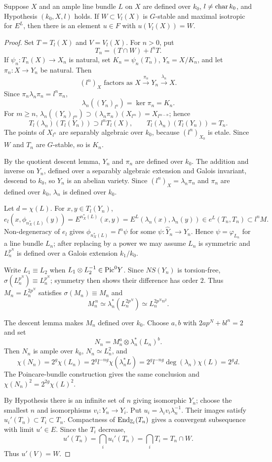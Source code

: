 \begin{proposition}[Step V]
\label{mumford-appI-step-V}
Suppose $X$ and an ample line bundle $L$ on $X$ are defined over $k_0$,
$l\ne {\rm char}\,k_0$, and Hypothesis $(k_0,X,l)$ holds. If
$W\subset V_l(X)$ is $G$-stable and maximal isotropic for $E^L$, then there
is an element $u\in F$ with $u(V_l(X))=W$.
\end{proposition}
\begin{proof}
Set $T=T_l(X)$ and $V=V_l(X)$. For $n>0$, put
\[
 T_n=(T\cap W)+l^nT.
\]
If $\psi_n:T_n(X)\to X_n$ is natural, set $K_n=\psi_n(T_n)$,
$Y_n=X/K_n$, and let $\pi_n:X\to Y_n$ be natural. Then
\[
 (l^n)_X\text{ factors as }X\xrightarrow{\pi_n}Y_n\xrightarrow{\lambda_n}X.
\]
Since $\pi_n\lambda_n\pi_n=l^n\pi_n$,
\[
 \lambda_n((Y_n)_{l^n})=\ker\pi_n=K_n.
\]
For $m\ge n$,
$\lambda_n((Y_n)_{l^m})\supset(\lambda_n\pi_n)(X_{l^m})=X_{l^{m-n}}$;
hence
\[
 T_l(\lambda_n)(T_l(Y_n))\supset l^nT_l(X),\qquad
 T_l(\lambda_n)(T_l(Y_n))=T_n.
\]
The points of $X_{l^n}$ are separably algebraic over $k_0$, because
$(l^n)_{X_0}$ is etale. Since $W$ and $T_n$ are $G$-stable, so is $K_n$.

By the quotient descent lemma, $Y_n$ and $\pi_n$ are defined over $k_0$.
The addition and inverse on $Y_n$, defined over a separably algebraic
extension and Galois invariant, descend to $k_0$, so $Y_n$ is an abelian
variety. Since $(l^n)_X=\lambda_n\pi_n$ and $\pi_n$ are defined over $k_0$,
$\lambda_n$ is defined over $k_0$.

Let $d=\chi(L)$. For $x,y\in T_l(Y_n)$,
\[
 e_l(x,\phi_{n_X^*(L)}(y))=E^{n_X^*(L)}(x,y)
 =E^L(\lambda_n(x),\lambda_n(y))\in e^L(T_n,T_n)\subset l^nM.
\]
Non-degeneracy of $e_l$ gives $\phi_{n_X^*(L)}=l^n\psi$ for some
$\psi:\widehat Y_n\to Y_n$. Hence $\psi=\varphi_{L_n}$ for a line bundle
$L_n$; after replacing by a power we may assume $L_n$ is symmetric and
$L_n^{p^N}$ is defined over a Galois extension $k_1/k_0$.

Write $L_1\equiv L_2$ when $L_1\otimes L_2^{-1}\in{\rm Pic}^0Y$. Since
$NS(Y_n)$ is torsion-free, $\sigma(L_n^{p^N})\equiv L_n^{p^N}$; symmetry
then shows their difference has order $2$. Thus $M_n=L_n^{2p^N}$ satisfies
$\sigma(M_n)\equiv M_n$ and
\[
 M_n^{\,n}\simeq\lambda_n^*(L_n^{2p^N})\simeq L_n^{2p^Nn^2}.
\]

The descent lemma makes $M_n$ defined over $k_0$. Choose $a,b$ with
$2ap^N+bl^n=2$ and set
\[
 N_n=M_n^a\otimes\lambda_n^*(L_n)^b.
\]
Then $N_n$ is ample over $k_0$, $N_n\simeq L_n^2$, and
\[
 \chi(N_n)=2^g\chi(L_n)=2^g l^{-ng}\chi(\lambda_n^*L)
 =2^g l^{-ng}\deg(\lambda_n)\chi(L)=2^gd.
\]
The Poincare-bundle construction gives the same conclusion and
$\chi(N_n)^2=2^{2g}\chi(L)^2$.

By Hypothesis there is an infinite set of $n$ giving isomorphic $Y_n$; choose
the smallest $n$ and isomorphisms $v_i:Y_n\to Y_i$. Put
$u_i=\lambda_i v_i\lambda_n^{-1}$. Their images satisfy
$u_i'(T_n)\subset T_i\subset T_n$. Compactness of
${\rm End}_{\mathbb Z_l}(T_n)$ gives a convergent subsequence with limit
$u'\in E$. Since the $T_i$ decrease,
\[
 u'(T_n)=\bigcap_i u_i'(T_n)=\bigcap_iT_i=T_n\cap W.
\]
Thus $u'(V)=W$.
\end{proof}

